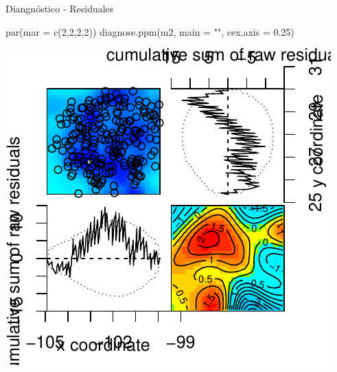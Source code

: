 \documentclass[
  11pt,
  ignorenonframetext,
]{beamer}
\newenvironment{Shaded}{}{}
\newcommand{\AttributeTok}[1]{\textcolor[rgb]{0.49,0.56,0.16}{#1}}
\newcommand{\DecValTok}[1]{\textcolor[rgb]{0.25,0.63,0.44}{#1}}
\newcommand{\FloatTok}[1]{\textcolor[rgb]{0.25,0.63,0.44}{#1}}
\newcommand{\FunctionTok}[1]{\textcolor[rgb]{0.02,0.16,0.49}{#1}}
\newcommand{\NormalTok}[1]{#1}
\newcommand{\StringTok}[1]{\textcolor[rgb]{0.25,0.44,0.63}{#1}}
\begin{document}
\begin{frame}[fragile]{Diangnóstico - Residuales}
\protect\hypertarget{diangnuxf3stico---residuales}{}
\begin{Shaded}
\begin{Highlighting}[]
\FunctionTok{par}\NormalTok{(}\AttributeTok{mar =} \FunctionTok{c}\NormalTok{(}\DecValTok{2}\NormalTok{,}\DecValTok{2}\NormalTok{,}\DecValTok{2}\NormalTok{,}\DecValTok{2}\NormalTok{))}
\FunctionTok{diagnose.ppm}\NormalTok{(m2, }\AttributeTok{main =} \StringTok{""}\NormalTok{, }\AttributeTok{cex.axis =} \FloatTok{0.25}\NormalTok{)}
\end{Highlighting}
\end{Shaded}

\begin{center}\includegraphics{Tutorial-spatstat-2_files/figure-beamer/unnamed-chunk-18-1} \end{center}
\end{frame}
\end{document}
